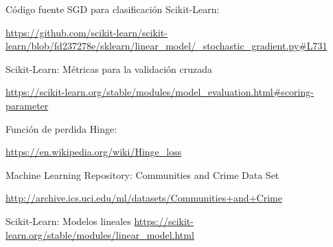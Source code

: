\documentclass[12pt, spanish]{article}
\begin{document}
\begin{thebibliography}{9}
Código fuente SGD para clasificación Scikit-Learn:

\url{https://github.com/scikit-learn/scikit-learn/blob/fd237278e/sklearn/linear_model/_stochastic_gradient.py#L731}



Scikit-Learn: Métricas para la validación cruzada

\url{https://scikit-learn.org/stable/modules/model_evaluation.html#scoring-parameter}


Función de perdida Hinge:

\url{https://en.wikipedia.org/wiki/Hinge_loss}


Machine Learning Repository: Communities and Crime Data Set  

\url{http://archive.ics.uci.edu/ml/datasets/Communities+and+Crime}

Scikit-Learn: Modelos lineales
\url{https://scikit-learn.org/stable/modules/linear_model.html}




\end{thebibliography}
\end{document}
